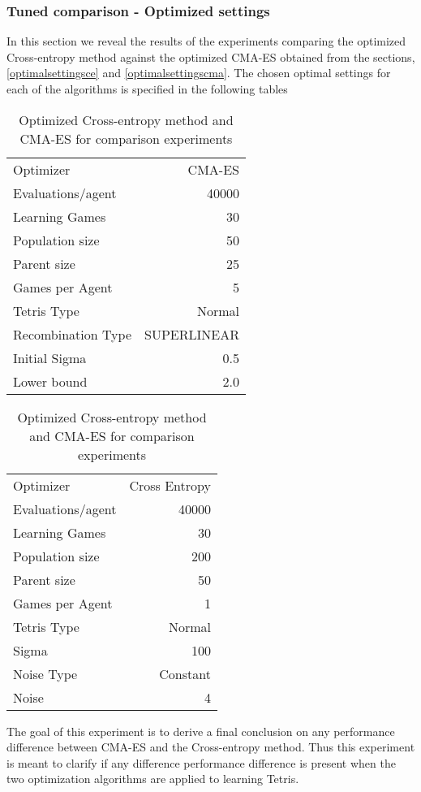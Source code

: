 \subsubsection{Tuned comparison - Optimized settings \label{tunedComparison}}
In this section we reveal the results of the experiments comparing 
the optimized Cross-entropy method
against the
optimized CMA-ES obtained from the sections, \ref{optimalsettingsce} and \ref{optimalsettingscma}.
The chosen optimal settings for each of the algorithms is specified in the following tables
\begin{table}[H]
\centering
\begin{tabular}{l r}
Optimizer & CMA-ES\\
Evaluations/agent & 40000\\
Learning Games & 30\\
Population size& 50\\
Parent size & 25\\
Games per Agent & 5\\
Tetris Type & Normal\\
\hline
Recombination Type & SUPERLINEAR\\
Initial Sigma & 0.5\\
Lower bound & 2.0\\
\end{tabular}
\quad
\begin{tabular}{l r}
Optimizer & Cross Entropy\\
Evaluations/agent & 40000\\
Learning Games & 30\\
Population size & 200\\
Parent size & 50\\
Games per Agent & 1\\
Tetris Type & Normal\\
\hline
Sigma & 100\\
Noise Type & Constant\\
Noise & 4
\end{tabular}
\caption{Optimized Cross-entropy method and CMA-ES for comparison experiments}
\end{table}
The goal of this experiment is to derive a final conclusion
on any performance difference between CMA-ES and the Cross-entropy method.
Thus this experiment is meant to clarify if any difference performance difference
is present when the two optimization algorithms are applied to learning Tetris.\\

